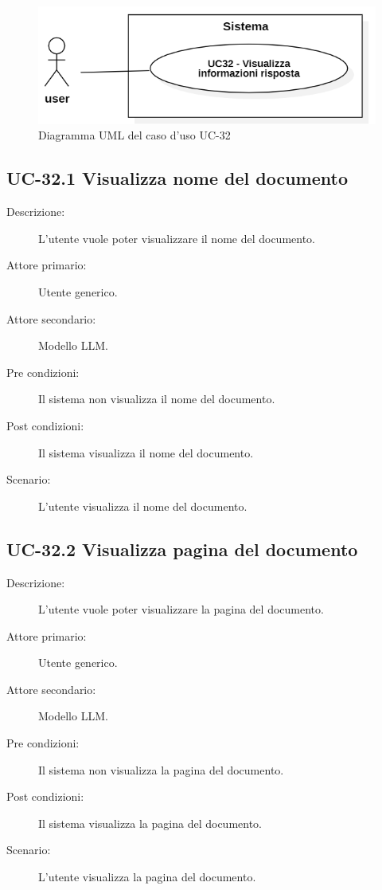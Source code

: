 \begin{figure}[H]
    \centering
    \includegraphics[width=0.9\linewidth]{UC32.PNG}
    \caption{Diagramma UML del caso d'uso UC-32}
    \label{fig:UC32}
\end{figure}

\subsection{UC-32.1 Visualizza nome del documento}
\begin{description}
    \item[Descrizione:] L'utente vuole poter visualizzare il nome del documento.
    \item[Attore primario:] Utente generico.
    \item[Attore secondario:] Modello LLM.
    \item[Pre condizioni:] Il sistema non visualizza il nome del documento.
    \item[Post condizioni:] Il sistema visualizza il nome del documento.
    \item[Scenario:] L'utente visualizza il nome del documento.
\end{description}

\subsection{UC-32.2 Visualizza pagina del documento}
\begin{description}
    \item[Descrizione:] L'utente vuole poter visualizzare la pagina del documento.
    \item[Attore primario:] Utente generico.
    \item[Attore secondario:] Modello LLM.
    \item[Pre condizioni:] Il sistema non visualizza la pagina del documento.
    \item[Post condizioni:] Il sistema visualizza la pagina del documento.
    \item[Scenario:] L'utente visualizza la pagina del documento.
\end{description}


